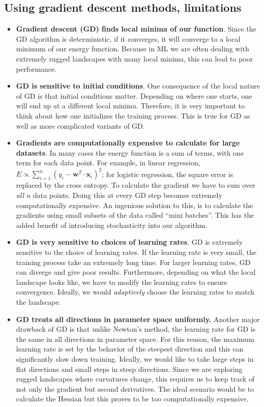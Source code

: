\documentclass[%
oneside,                 %
final,                   %
10pt]{article}
\begin{document}
\subsection*{Using gradient descent methods, limitations}

\begin{itemize}
\item \textbf{Gradient descent (GD) finds local minima of our function}. Since the GD algorithm is deterministic, if it converges, it will converge to a local minimum of our energy function. Because in ML we are often dealing with extremely rugged landscapes with many local minima, this can lead to poor performance.

\item \textbf{GD is sensitive to initial conditions}. One consequence of the local nature of GD is that initial conditions matter. Depending on where one starts, one will end up at a different local minima. Therefore, it is very important to think about how one initializes the training process. This is true for GD as well as more complicated variants of GD.

\item \textbf{Gradients are computationally expensive to calculate for large datasets}. In many cases the energy function is a sum of terms, with one term for each data point. For example, in linear regression, $E \propto \sum_{i=1}^n (y_i - \mathbf{w}^T\cdot\mathbf{x}_i)^2$; for logistic regression, the square error is replaced by the cross entropy. To calculate the gradient we have to sum over \emph{all} $n$ data points. Doing this at every GD step becomes extremely computationally expensive. An ingenious solution to this, is to calculate the gradients using small subsets of the data called ``mini batches''. This has the added benefit of introducing stochasticity into our algorithm.

\item \textbf{GD is very sensitive to choices of learning rates}. GD is extremely sensitive to the choice of learning rates. If the learning rate is very small, the training process take an extremely long time. For larger learning rates, GD can diverge and give poor results. Furthermore, depending on what the local landscape looks like, we have to modify the learning rates to ensure convergence. Ideally, we would \emph{adaptively} choose the learning rates to match the landscape.

\item \textbf{GD treats all directions in parameter space uniformly.} Another major drawback of GD is that unlike Newton's method, the learning rate for GD is the same in all directions in parameter space. For this reason, the maximum learning rate is set by the behavior of the steepest direction and this can significantly slow down training. Ideally, we would like to take large steps in flat directions and small steps in steep directions. Since we are exploring rugged landscapes where curvatures change, this requires us to keep track of not only the gradient but second derivatives. The ideal scenario would be to calculate the Hessian but this proves to be too computationally expensive. 


\end{itemize}
\end{document}
